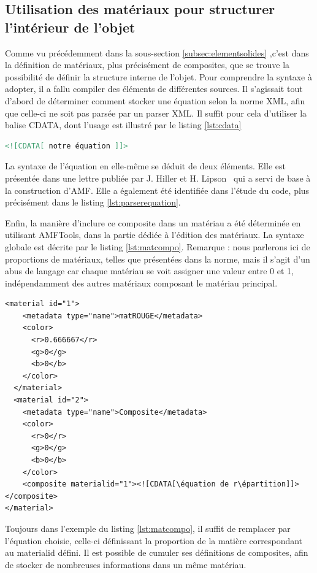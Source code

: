 \documentclass{tnreport}
\begin{document}
\subsection{Utilisation des matériaux pour structurer l'intérieur de l'objet}
\label{subsec:mathdesc}
Comme vu précédemment dans la sous-section \ref{subsec:elementsolides} ,c'est dans la définition de matériaux, plus précisément de composites, que se trouve la possibilité de définir la structure interne de l'objet. Pour comprendre la syntaxe à adopter, il a fallu compiler des éléments de différentes sources.
Il s'agissait tout d'abord de déterminer comment stocker une équation selon la norme XML, afin que celle-ci ne soit pas parsée par un parser XML. Il suffit pour cela d'utiliser la balise CDATA, dont l'usage est illustré par le listing \ref{lst:cdata} 
\begin{lstlisting}[language=XML, caption={balise CDATA}, label={lst:cdata}]
<![CDATA[ notre équation ]]>
\end{lstlisting}
La syntaxe de l'équation en elle-même se déduit de deux éléments. Elle est présentée dans une lettre publiée par J. Hiller et H. Lipson~\cite{articlebaseAMF} qui a servi de base à la construction d'AMF. Elle a également été identifiée dans l'étude du code, plus précisément dans le listing \ref{lst:parserequation}. 

Enfin, la manière d'inclure ce composite dans un matériau a été déterminée en utilisant AMFTools, dans la partie dédiée à l'édition des matériaux. La syntaxe globale est décrite par le listing \ref{lst:matcompo}. Remarque : nous parlerons ici de proportions de matériaux, telles que présentées dans la norme, mais il s'agit d'un abus de langage car chaque matériau se voit assigner une valeur entre 0 et 1, indépendamment des autres matériaux composant le matériau principal.
\begin{lstlisting}[language=AMF, caption={syntaxe matériau composite}, label={lst:matcompo}]
<material id="1">
    <metadata type="name">matROUGE</metadata>
    <color>
      <r>0.666667</r>
      <g>0</g>
      <b>0</b>
    </color>
  </material>
  <material id="2">
    <metadata type="name">Composite</metadata>
    <color>
      <r>0</r>
      <g>0</g>
      <b>0</b>
    </color>
    <composite materialid="1"><![CDATA[\équation de r\épartition]]></composite>
</material>
\end{lstlisting}
Toujours dans l'exemple du listing \ref{lst:matcompo}, il suffit de remplacer par l'équation choisie, celle-ci définissant la proportion de la matière correspondant au materialid défini. Il est possible de cumuler ses définitions de composites, afin de stocker de nombreuses informations dans un même matériau.
\end{document}
